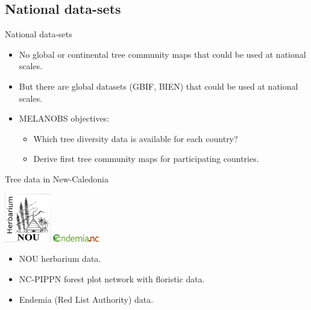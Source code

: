 \documentclass[10pt,table,dvipsnames,compress]{beamer}
\begin{document}
\subsection{National data-sets}
\label{sec:org723afd8}

\begin{frame}[label={sec:org74bd819}]{National data-sets}
\begin{itemize}
\item No global or continental tree community maps that could be used at national scales.
\item But there are global datasets (GBIF, BIEN) that could be used at national scales.
\item MELANOBS objectives:
\begin{itemize}
\item Which tree diversity data is available for each country?
\item Derive first tree community maps for participating countries.
\end{itemize}
\end{itemize}
\end{frame}

\begin{frame}[label={sec:org55d0923}]{Tree data in New-Caledonia}
\begin{center}
\includegraphics[width=2cm]{figs/biodiv/NOU-herbarium-logo.jpg}
\includegraphics[width=2cm]{figs/biodiv/logo_endemia.png}
\end{center}

\begin{itemize}
\item NOU herbarium data.
\item NC-PIPPN forest plot network with floristic data.
\item Endemia (Red List Authority) data.
\end{itemize}
\end{frame}
\end{document}
